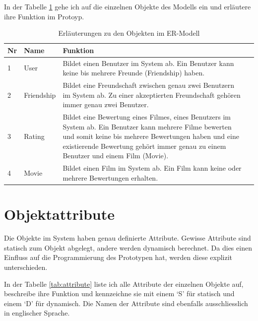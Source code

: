 In der Tabelle \ref{tab:erm} gehe ich auf die einzelnen Objekte des Modells ein
und erläutere ihre Funktion im Protoyp.

\begin{table}[ht]
\begin{center}
    \begin{tabular}{llp{10cm}l}
        \toprule Nr & Name & Funktion \\
        \midrule 1 & User & Bildet einen Benutzer im System ab. Ein Benutzer
                     kann keine bis mehrere Freunde (Friendship) haben. \\
        \midrule 2 & Friendship & Bildet eine Freundschaft zwischen genau zwei
                     Benutzern im System ab. Zu einer akzeptierten Freundschaft 
                     gehören immer genau zwei Benutzer. \\
        \midrule 3 & Rating & Bildet eine Bewertung eines Filmes, eines Benutzers
                     im System ab. Ein Benutzer kann mehrere Filme bewerten und
                     somit keine bis mehrere Bewertungen haben und eine 
                     existierende Bewertung gehört immer genau zu einem Benutzer 
                     und einem Film (Movie). \\
        \midrule 4 & Movie & Bildet einen Film im System ab. Ein Film kann keine
                     oder mehrere Bewertungen erhalten. \\
        \bottomrule
    \end{tabular}
    \caption{Erläuterungen zu den Objekten im ER-Modell}
    \label{tab:erm}
\end{center}
\end{table}

\clearpage

\section{Objektattribute}
Die Objekte im System haben genau definierte Attribute. Gewisse Attribute sind
statisch zum Objekt abgelegt, andere werden dynamisch berechnet. Da dies einen
Einfluss auf die Programmierung des Prototypen hat, werden diese explizit 
unterschieden.

In der Tabelle \ref{tab:attribute} liste ich alle Attribute
der einzelnen Objekte auf, beschreibe ihre Funktion und kennzeichne sie mit
einem `S' für statisch und einem `D' für dynamisch. Die Namen der Attribute sind 
ebenfalls ausschliesslich in englischer Sprache.

